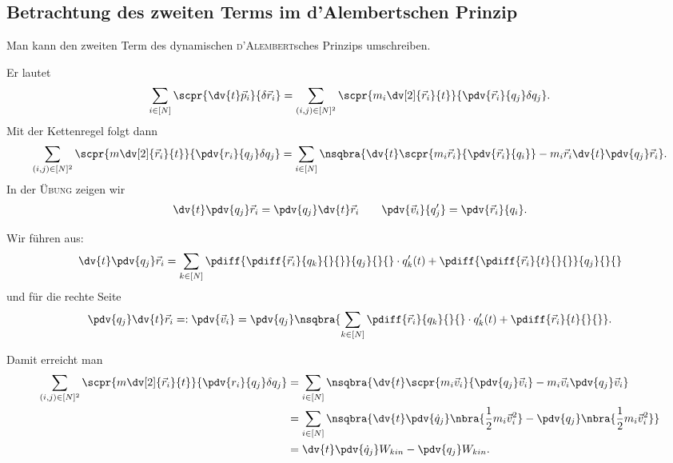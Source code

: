 \documentclass[../main.tex]{subfiles}
\begin{document}
		\subsection{Betrachtung des zweiten Terms im d'Alembertschen Prinzip}
			\begin{Behauptung}
				Man kann den zweiten Term des dynamischen \textsc{d'Alembert}sches Prinzips umschreiben. 
			\end{Behauptung}
			\begin{begruendung}
				Er lautet
				\begin{align*}
					\sum_{i\in[N]}\scpr{\dv{t}\vec{p}_i}{\delta\vec{r}_i}=\sum_{(i,j)\in[N]^2}\scpr{m_i\dv[2]{\vec{r}_i}{t}}{\pdv{\vec r_i}{q_j}\delta q_j}.
				\end{align*}
				Mit der Kettenregel folgt dann 
				\begin{align*}
					\sum_{(i,j)\in[N]^2}\scpr{m\dv[2]{\vec{r}_i}{t}}{\pdv{r_i}{q_j}\delta q_j}=\sum_{i\in[N]}\nsqbra{\dv{t}\scpr{m_i\vec{r}_i}{\pdv{\vec{r}_i}{q_i}}-m_i\vec{r}_i\dv{t}\pdv{q_j}\vec{r}_i}. 
				\end{align*}
				In der \textsc{Übung} zeigen wir 
				\begin{align*}
					\dv{t}\pdv{q_j}\vec r_i=\pdv{q_j}\dv{t}\vec r_i \qquad \pdv{\vec{v}_i}{q'_j}=\pdv{\vec{r}_i}{q_i}. 
				\end{align*}
				\begin{begruendung}
					Wir führen aus:
					\begin{align*}
						\dv{t}\pdv{q_j}\vec r_i=\sum_{k\in[N]}\pdiff{\pdiff{\vec r_i}{q_k}{}{}}{q_j}{}{}\cdot q'_k(t)+\pdiff{\pdiff{\vec r_i}{t}{}{}}{q_j}{}{}
					\end{align*}
					und für die rechte Seite
					\begin{align*}
						\pdv{q_j}\dv{t}\vec r_i=:\pdv{\vec v_i}=\pdv{q_j}\nsqbra{\sum_{k\in[N]}\pdiff{\vec r_i}{q_k}{}{}\cdot q'_k(t)+\pdiff{\vec{r}_i}{t}{}{}}. 
					\end{align*}
				\end{begruendung}
				Damit erreicht man 
				\begin{align*}
					\sum_{(i,j)\in[N]^2}\scpr{m\dv[2]{\vec{r}_i}{t}}{\pdv{r_i}{q_j}\delta q_j}&=\sum_{i\in[N]}\nsqbra{\dv{t}\scpr{m_i\vec{v}_i}{\pdv{q_j}\vec{v}_i}-m_i\vec{v}_i\pdv{q_j}\vec v_i} \\
					&=\sum_{i\in[N]}\nsqbra{\dv{t}\pdv{\dot q_j}\nbra{\frac{1}{2}m_i\vec{v}_i^2}-\pdv{q_j}\nbra{\frac{1}{2}m_i\vec{v}_i^2}} \\
					&=\dv{t}\pdv	{\dot q_j}W_{kin}-\pdv{q_j}W_{kin}. 
				\end{align*}
			\end{begruendung}
\end{document}

